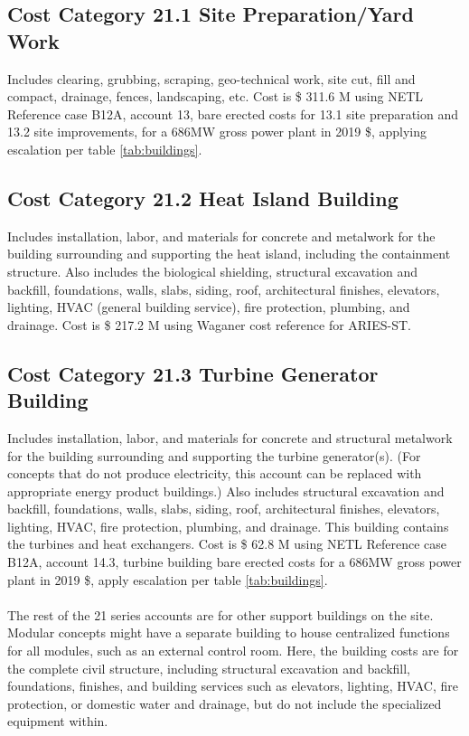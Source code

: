 










\subsection*{Cost Category 21.1 Site Preparation/Yard Work}
Includes clearing, grubbing, scraping, geo-technical work, site cut, fill and compact, drainage, fences, landscaping, etc.  Cost is \$ 311.6 M using NETL Reference case B12A, account 13, bare erected costs for 13.1 site preparation and 13.2 site improvements, for a 686MW gross power plant in 2019 \$, applying escalation per table \ref{tab:buildings}.

\subsection*{Cost Category 21.2 Heat Island Building}
Includes installation, labor, and materials for concrete and metalwork for the building surrounding and supporting the heat island, including the containment structure. Also includes the biological shielding, structural excavation and backfill, foundations, walls, slabs, siding, roof, architectural finishes, elevators, lighting, HVAC (general building service), fire protection, plumbing, and drainage. Cost is \$ 217.2 M using Waganer cost reference for ARIES-ST.


\subsection*{Cost Category 21.3 Turbine Generator Building}
Includes installation, labor, and materials for concrete and structural metalwork for the building surrounding and supporting the turbine generator(s). (For concepts that do not produce electricity, this account can be replaced with appropriate energy product buildings.) Also includes structural excavation and backfill, foundations, walls, slabs, siding, roof, architectural finishes, elevators, lighting, HVAC, fire protection, plumbing, and drainage.  This building contains the turbines and heat exchangers. Cost is \$ 62.8 M using NETL Reference case B12A, account 14.3, turbine building bare erected costs for a 686MW gross power plant in 2019 \$, apply escalation per table \ref{tab:buildings}.

\paragraph{}
The rest of the 21 series accounts are for other support buildings on the site. Modular concepts might have a separate building to house centralized functions for all modules, such as an external control room. Here, the building costs are for the complete civil structure, including structural excavation and backfill, foundations, finishes, and building services such as elevators, lighting, HVAC, fire protection, or domestic water and drainage, but do not include the specialized equipment within.


